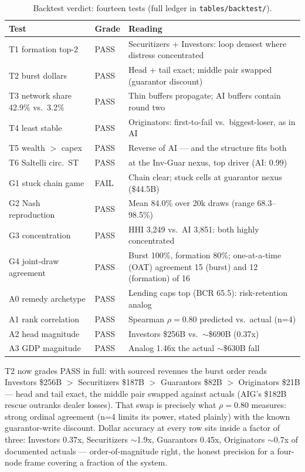 \documentclass[11pt,a4paper]{article}
\begin{document}
\begin{table}[htbp]
\centering
\caption{Backtest verdict: fourteen tests (full ledger in \texttt{tables/backtest/}).}
    \label{tab:35-backtest-verdict-four}
{\small
\begin{tabular}{>{\raggedright\arraybackslash}p{3.4cm}>{\raggedright\arraybackslash}p{1.6cm}>{\raggedright\arraybackslash}p{6.4cm}}
\toprule
Test & Grade & Reading \\
\midrule
T1 formation top-2 & PASS & Securitizers + Investors: loop densest where distress concentrated \\
T2 burst dollars & PASS & Head + tail exact; middle pair swapped (guarantor discount) \\
T3 network share 42.9\% vs.\ 3.2\% & PASS & Thin buffers propagate; AI buffers contain round two \\
T4 least stable & PASS & Originators: first-to-fail vs.\ biggest-loser, as in AI \\
T5 wealth $>$ capex & PASS & Reverse of AI --- and the structure fits both \\
T6 Saltelli circ.\ ST & PASS & 0.97 at the Inv-Guar nexus, top driver (AI: 0.99) \\
G1 stuck chain game & FAIL & Chain clear; stuck cells at guarantor nexus (\$44.5B) \\
G2 Nash reproduction & PASS & Mean 84.0\% over 20k draws (range 68.3--98.5\%) \\
G3 concentration & PASS & HHI 3,249 vs.\ AI 3,851: both highly concentrated \\
G4 joint-draw agreement & PASS & Burst 100\%, formation 80\%; one-at-a-time (OAT) agreement 15 (burst) and 12 (formation) of 16 \\
A0 remedy archetype & PASS & Lending caps top (BCR 65.5): risk-retention analog \\
A1 rank correlation & PASS & Spearman $\rho=0.80$ predicted vs.\ actual (n=4) \\
A2 head magnitude & PASS & Investors \$256B vs.\ $\sim$\$690B (0.37x) \\
A3 GDP magnitude & PASS & Analog 1.46x the actual $\sim$\$630B fall \\
\bottomrule
\end{tabular}
\par}
\end{table}

T2 now grades PASS in full: with sourced revenues the burst order reads
Investors \$256B $>$ Securitizers \$187B $>$ Guarantors \$82B $>$ Originators
\$21B --- head and tail exact, the middle pair swapped against actuals
(AIG's \$182B rescue outranks dealer losses). That swap is precisely what
$\rho=0.80$ measures: strong ordinal agreement (n=4 limits its power, stated
plainly) with the known guarantor-write discount. Dollar accuracy at every
row sits inside a factor of three: Investors 0.37x, Securitizers
$\sim$1.9x, Guarantors 0.45x, Originators $\sim$0.7x of documented actuals
--- order-of-magnitude right, the honest precision for a four-node frame
covering a fraction of the system.
\end{document}
